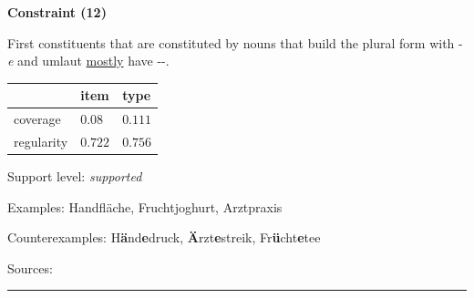 \begin{center}
\textbf{Constraint (12)}
\end{center}

\noindent
First constituents that are constituted by nouns that build the plural form with -\textit{e} and umlaut \underline{mostly} have \mbox{-{\zeroLinker}-}.
\vspace{0.35em}


\vspace{-0.35em}

\begin{table}[!ht]
\begin{center}

\begin{tabularx}{\columnwidth}{|X|X|X|}
\hline
 & item & type \\
\hline
 coverage & $0.08$ & $0.111$ \\
\hline
 regularity & $0.722$ & $0.756$ \\
\hline
\end{tabularx}
\end{center}
\end{table}

\vspace{-1.35em}

\noindent
Support level: \textit{supported}

\vspace{0.3em}

\noindent
Examples: Hand{\zeroLinker}fläche, Frucht{\zeroLinker}joghurt, Arzt{\zeroLinker}praxis

\noindent
Counterexamples: H\textbf{ä}nd\textbf{e}druck, \textbf{Ä}rzt\textbf{e}streik, Fr\textbf{ü}cht\textbf{e}tee

\vspace{0.3em}

\noindent
Sources: \citet[83, 107]{ortner_mueller-bollhagen_1991}


\hrule





